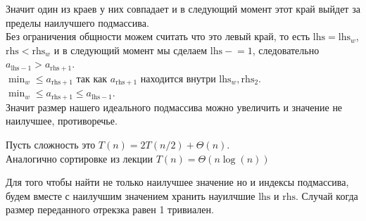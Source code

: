 \documentclass[12pt]{exam}
\newcommand{\minuseq}{\mathrel{-}=}
\begin{document}
Значит один из краев у них совпадает и в следующий момент этот край выйдет за пределы наилучшего подмассива.\\
Без ограничения общности можем считать что это левый край, то есть $\mathrm{lhs} = \mathrm{lhs}_w$, $\mathrm{rhs} < \mathrm{rhs}_w$ и 
в следующий момент мы сделаем $\mathrm{lhs} \minuseq 1$, следовательно $a_{\mathrm{lhs} - 1} > a_{\mathrm{rhs} + 1}$.\\
$\min_w \leq a_{\mathrm{rhs} + 1}$ так как $a_{\mathrm{rhs} + 1}$ находится внутри $\mathrm{lhs}_w, \mathrm{rhs}_2$.\\
$\min_w \leq a_{\mathrm{rhs} + 1} \leq a_{\mathrm{lhs} - 1}$. \\
Значит размер нашего идеального подмассива можно увеличить и значение не наилучшее, противоречье.

Пусть сложность это $T(n) = 2T(n/2) + \Theta(n)$. \\
Аналогично сортировке из лекции $T(n) = \Theta(n \log(n))$

Для того чтобы найти не только наилучшее значение но и индексы подмассива, будем вместе с наилучшим значением хранить науилчшие $\mathrm{lhs}$ и $\mathrm{rhs}$.
Случай когда размер переданного отрекзка равен 1 тривиален.
\end{document}
